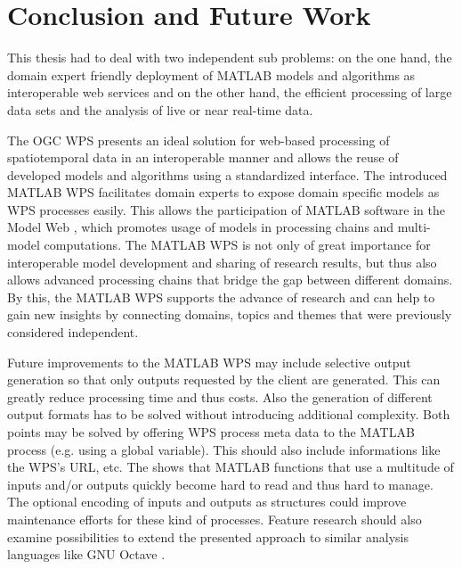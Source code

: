
\chapter{Conclusion and Future Work}
\label{sec:conclusion}

This thesis had to deal with two independent sub problems: on the one hand, the domain expert friendly deployment of MATLAB models and algorithms as interoperable web services and on the other hand, the efficient processing of large data sets and the analysis of live or near real-time data.

The \ac{OGC} \acl{WPS} presents an ideal solution for web-based processing of spatiotemporal data in an interoperable manner and allows the reuse of developed models and algorithms using a standardized interface. The introduced MATLAB WPS facilitates domain experts to expose domain specific models as WPS processes easily. This allows the participation of MATLAB software in the Model Web \citep{geller2008looking}, which promotes usage of models in processing chains and multi-model computations. The MATLAB WPS is not only of great importance for interoperable model development and sharing of research results, but thus also allows advanced processing chains that bridge the gap between different domains. By this, the MATLAB WPS supports the advance of research and can help to gain new insights by connecting domains, topics and themes that were previously considered independent.

Future improvements to the MATLAB WPS may include selective output generation so that only outputs requested by the client are generated. This can greatly reduce processing time and thus costs. Also the generation of different output formats has to be solved without introducing additional complexity. Both points may be solved by offering WPS process meta data to the MATLAB process (e.g. using a global variable). This should also include informations like the WPS's URL, etc. The \la shows that MATLAB functions that use a multitude of inputs and/or outputs quickly become hard to read and thus hard to manage. The optional encoding of inputs and outputs as structures could improve maintenance efforts for these kind of processes. Feature research should also examine possibilities to extend the presented approach to similar analysis languages like GNU Octave \citep{octave}.

